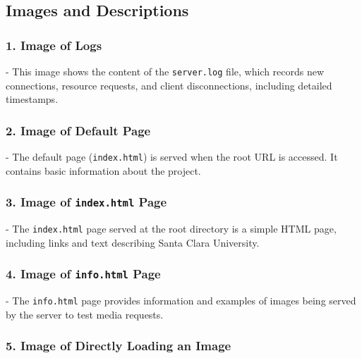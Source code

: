 \subsection{Images and Descriptions}\label{images-and-descriptions}

\subsubsection{1. Image of Logs}\label{image-of-logs}

 -
This image shows the content of the \texttt{server.log} file, which
records new connections, resource requests, and client disconnections,
including detailed timestamps.

\subsubsection{2. Image of Default Page}\label{image-of-default-page}

- The default page (\texttt{index.html}) is served when the root URL is
accessed. It contains basic information about the project.

\subsubsection{\texorpdfstring{3. Image of \texttt{index.html}
Page}{3. Image of index.html Page}}\label{image-of-index.html-page}

 -
The \texttt{index.html} page served at the root directory is a simple
HTML page, including links and text describing Santa Clara University.

\subsubsection{\texorpdfstring{4. Image of \texttt{info.html}
Page}{4. Image of info.html Page}}\label{image-of-info.html-page}

- The \texttt{info.html} page provides information and examples of
images being served by the server to test media requests.

\subsubsection{5. Image of Directly Loading an
Image}\label{image-of-directly-loading-an-image}

